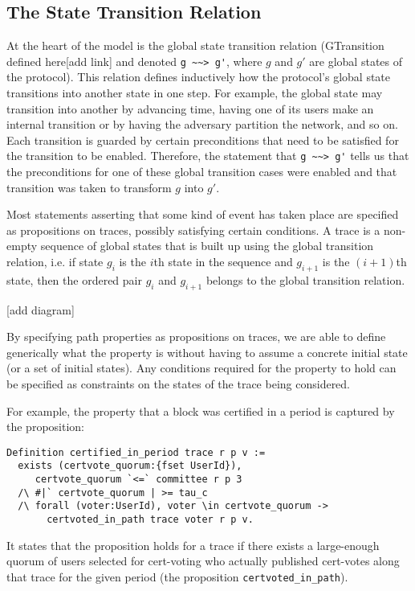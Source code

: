 \subsection{The State Transition Relation}
At the heart of the model is the global state transition relation (GTransition defined here[add link] and denoted \lstinline{g ~~> g'}, where $g$ and $g'$ are global states of the protocol). This relation defines inductively how the protocol's global state transitions into another state in one step. For example, the global state may transition into another by advancing time, having one of its users make an internal transition or by having the adversary partition the network, and so on. Each transition is guarded by certain preconditions that need to be satisfied for the transition to be enabled. Therefore, the statement that \lstinline{g ~~> g'} tells us that the preconditions for one of these global transition cases were enabled and that transition was taken to transform $g$ into $g'$.

Most statements asserting that some kind of event has taken place are specified as propositions on traces, possibly satisfying certain conditions. A trace is a non-empty sequence of global states that is built up using the global transition relation, i.e. if state $g_i$ is the $i$th state in the sequence and $g_{i+1}$ is the $(i+1)$th state, then the ordered pair $g_i$ and $g_{i+1}$ belongs to the global transition relation. 

[add diagram]

By specifying path properties as propositions on traces, we are able to define generically what the property is without having to assume a concrete initial state (or a set of initial states). Any conditions required for the property to hold can be specified as constraints on the states of the trace being considered.

For example, the property that a block was certified in a period is captured by the proposition:

\begin{lstlisting}[language=Coq]
Definition certified_in_period trace r p v :=
  exists (certvote_quorum:{fset UserId}),
     certvote_quorum `<=` committee r p 3
  /\ #|` certvote_quorum | >= tau_c
  /\ forall (voter:UserId), voter \in certvote_quorum ->
       certvoted_in_path trace voter r p v.
\end{lstlisting}

It states that the proposition holds for a trace if there exists a large-enough quorum of users selected for cert-voting who actually published cert-votes along that trace for the given period (the proposition \lstinline{certvoted_in_path}).

